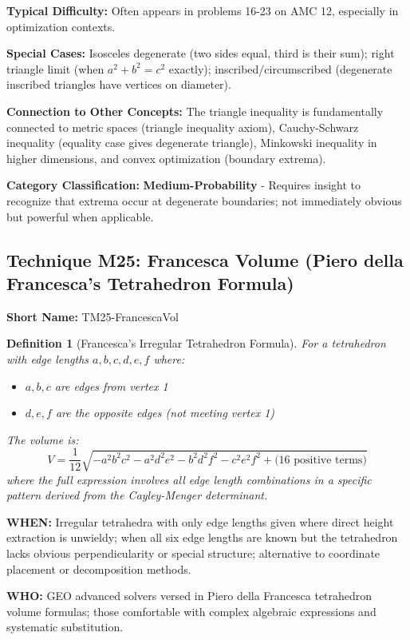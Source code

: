 \documentclass[12pt]{article}
\newtheorem{definition}{Definition}[section]
\begin{document}
\textbf{Typical Difficulty:} Often appears in problems 16-23 on AMC 12, especially in optimization contexts.

\textbf{Special Cases:} Isosceles degenerate (two sides equal, third is their sum); right triangle limit (when $a^2 + b^2 = c^2$ exactly); inscribed/circumscribed (degenerate inscribed triangles have vertices on diameter).

\textbf{Connection to Other Concepts:} The triangle inequality is fundamentally connected to metric spaces (triangle inequality axiom), Cauchy-Schwarz inequality (equality case gives degenerate triangle), Minkowski inequality in higher dimensions, and convex optimization (boundary extrema).

\textbf{Category Classification:} \textbf{Medium-Probability} - Requires insight to recognize that extrema occur at degenerate boundaries; not immediately obvious but powerful when applicable.

\subsection{Technique M25: Francesca Volume (Piero della Francesca's Tetrahedron Formula)}
\textbf{Short Name:} TM25-FrancescaVol

\begin{definition}[Francesca's Irregular Tetrahedron Formula]
For a tetrahedron with edge lengths $a, b, c, d, e, f$ where:
\begin{itemize}
    \item $a, b, c$ are edges from vertex 1
    \item $d, e, f$ are the opposite edges (not meeting vertex 1)
\end{itemize}
The volume is:
\[
V = \frac{1}{12} \sqrt{-a^2b^2c^2 - a^2d^2e^2 - b^2d^2f^2 - c^2e^2f^2 + \text{(16 positive terms)}}
\]
where the full expression involves all edge length combinations in a specific pattern derived from the Cayley-Menger determinant.
\end{definition}

\textbf{WHEN:} Irregular tetrahedra with only edge lengths given where direct height extraction is unwieldy; when all six edge lengths are known but the tetrahedron lacks obvious perpendicularity or special structure; alternative to coordinate placement or decomposition methods.

\textbf{WHO:} GEO advanced solvers versed in Piero della Francesca tetrahedron volume formulas; those comfortable with complex algebraic expressions and systematic substitution.
\end{document}
